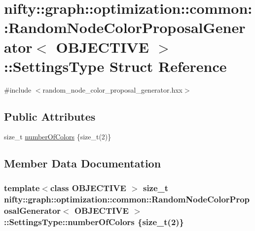 \hypertarget{structnifty_1_1graph_1_1optimization_1_1common_1_1RandomNodeColorProposalGenerator_1_1SettingsType}{}\section{nifty\+:\+:graph\+:\+:optimization\+:\+:common\+:\+:Random\+Node\+Color\+Proposal\+Generator$<$ O\+B\+J\+E\+C\+T\+I\+V\+E $>$\+:\+:Settings\+Type Struct Reference}
\label{structnifty_1_1graph_1_1optimization_1_1common_1_1RandomNodeColorProposalGenerator_1_1SettingsType}


{\ttfamily \#include $<$random\+\_\+node\+\_\+color\+\_\+proposal\+\_\+generator.\+hxx$>$}

\subsection*{Public Attributes}
\begin{DoxyCompactItemize}
\item 
size\+\_\+t \hyperlink{structnifty_1_1graph_1_1optimization_1_1common_1_1RandomNodeColorProposalGenerator_1_1SettingsType_a7526bef233011ca8f3210cd99cf4f117}{number\+Of\+Colors} \{size\+\_\+t(2)\}
\end{DoxyCompactItemize}


\subsection{Member Data Documentation}
\hypertarget{structnifty_1_1graph_1_1optimization_1_1common_1_1RandomNodeColorProposalGenerator_1_1SettingsType_a7526bef233011ca8f3210cd99cf4f117}{}
\subsubsection[{number\+Of\+Colors}]{\setlength{\rightskip}{0pt plus 5cm}template$<$class O\+B\+J\+E\+C\+T\+I\+V\+E $>$ size\+\_\+t {\bf nifty\+::graph\+::optimization\+::common\+::\+Random\+Node\+Color\+Proposal\+Generator}$<$ O\+B\+J\+E\+C\+T\+I\+V\+E $>$\+::Settings\+Type\+::number\+Of\+Colors \{size\+\_\+t(2)\}}\label{structnifty_1_1graph_1_1optimization_1_1common_1_1RandomNodeColorProposalGenerator_1_1SettingsType_a7526bef233011ca8f3210cd99cf4f117}


